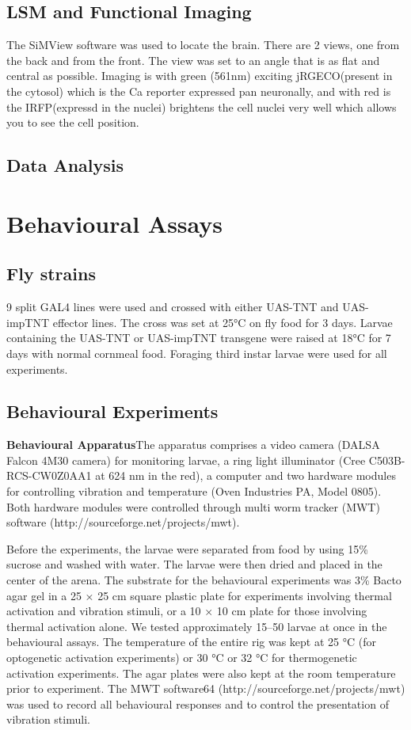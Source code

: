 \subsection{LSM and Functional Imaging}
The SiMView software was used to locate the brain. There are 2 views, one from the back and from the front. The view was set to an angle that is as flat and central as possible. Imaging is with green (561nm) exciting jRGECO(present in the cytosol) which is the Ca reporter expressed pan neuronally, and with red is the IRFP(expressd in the nuclei) brightens the cell nuclei very well which allows you to see the cell position. 


\subsection{Data Analysis}



\section{Behavioural Assays}
\subsection{Fly strains}
9 split GAL4 lines were used and crossed with either UAS-TNT and UAS-impTNT effector lines.
The cross was set at 25°C on fly food for 3 days. Larvae containing the UAS-TNT or UAS-impTNT transgene were raised at 18°C for 7 days with normal cornmeal food. Foraging third instar larvae were used for all experiments. 

\subsection{Behavioural Experiments}
\textbf{Behavioural Apparatus}The apparatus comprises a video camera (DALSA Falcon 4M30 camera) for monitoring larvae, a ring light illuminator (Cree C503B-RCS-CW0Z0AA1 at 624 nm in the red), a computer and two hardware modules for controlling vibration and temperature (Oven Industries PA, Model 0805). Both hardware modules were controlled through multi worm tracker (MWT) software (http://sourceforge.net/projects/mwt). %


Before the experiments, the larvae were separated from food by using 15\% sucrose and washed with water. The larvae were then dried and placed in the center of the arena. The substrate for the behavioural experiments was 3\% Bacto agar gel in a 25 × 25 cm square plastic plate for experiments involving thermal activation and vibration stimuli, or a 10 × 10 cm plate for those involving thermal activation alone. We tested approximately 15–50 larvae at once in the behavioural assays. The temperature of the entire rig was kept at 25 °C (for optogenetic activation experiments) or 30 °C or 32 °C for thermogenetic activation experiments. The agar plates were also kept at the room temperature prior to experiment. The MWT software64 (http://sourceforge.net/projects/mwt) was used to record all behavioural responses and to control the presentation of vibration stimuli. %

